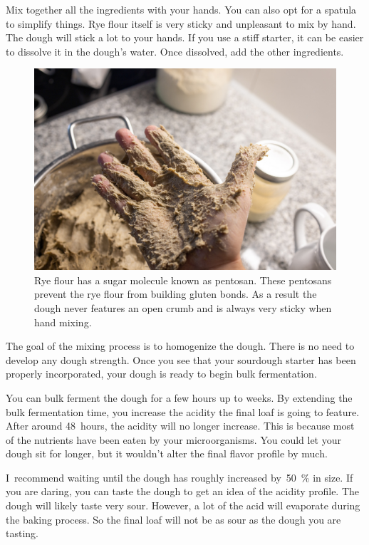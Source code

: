 Mix together all the ingredients with your hands. You can also
opt for a spatula to simplify things. Rye flour itself is very
sticky and unpleasant to mix by hand. The dough will stick
a lot to your hands. If you use a stiff starter, it can be
easier to dissolve it in the dough's water. Once dissolved,
add the other ingredients.

\begin{figure}[!htb]
  \includegraphics[width=\textwidth]{sticky-hands}
  \caption[Sticky rye dough]{Rye flour has a sugar molecule known as pentosan.
      These pentosans prevent the rye flour from building gluten bonds. As a
      result the dough never features an open crumb and is always very sticky
      when hand mixing.}%
  \label{fig:non-wheat-sticky-hands}
\end{figure}

The goal of the mixing process is to homogenize the dough. There
is no need to develop any dough strength. Once you see that
your sourdough starter has been properly incorporated, your
dough is ready to begin bulk fermentation.

You can bulk ferment the dough for a few hours up to
weeks. By extending the bulk fermentation time, you increase
the acidity the final loaf is going to feature. After around
48~hours, the acidity will no longer increase. This is because
most of the nutrients have been eaten by your microorganisms.
You could let your dough sit for longer, but it wouldn't alter the
final flavor profile by much.

I~recommend waiting until the dough has roughly increased by~\qty{50}{\percent}
in size. If you are daring, you can taste the dough
to get an idea of the acidity profile. The dough will likely
taste very sour. However, a lot of the acid will evaporate
during the baking process. So the final loaf will not be
as sour as the dough you are tasting.

